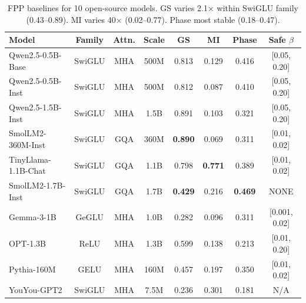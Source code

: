 
\begin{table}[t]
\centering
\caption{FPP baselines for 10 open-source models. GS varies 2.1$\times$ within SwiGLU family 
(0.43--0.89). MI varies 40$\times$ (0.02--0.77). Phase most stable (0.18--0.47).}
\label{tab:ten_models_full}
\begin{tabular}{lccccccc}
\toprule
Model & Family & Attn. & Scale & GS & MI & Phase & Safe $\beta$ \\
\midrule
Qwen2.5-0.5B-Base  & SwiGLU & MHA & 500M & 0.813 & 0.129 & 0.416 & [0.05, 0.20] \\
Qwen2.5-0.5B-Inst  & SwiGLU & MHA & 500M & 0.812 & 0.087 & 0.410 & [0.05, 0.20] \\
Qwen2.5-1.5B-Inst  & SwiGLU & MHA & 1.5B & 0.891 & 0.103 & 0.321 & [0.05, 0.20] \\
SmolLM2-360M-Inst  & SwiGLU & GQA & 360M & \textbf{0.890} & 0.069 & 0.311 & [0.01, 0.02] \\
TinyLlama-1.1B-Chat& SwiGLU & GQA & 1.1B & 0.798 & \textbf{0.771} & 0.389 & [0.01, 0.02] \\
SmolLM2-1.7B-Inst  & SwiGLU & GQA & 1.7B & \textbf{0.429} & 0.216 & \textbf{0.469} & NONE \\
Gemma-3-1B         & GeGLU  & MHA & 1.0B & 0.282 & 0.096 & 0.311 & [0.001, 0.02] \\
OPT-1.3B           & ReLU   & MHA & 1.3B & 0.599 & 0.138 & 0.213 & [0.01, 0.20] \\
Pythia-160M        & GELU   & MHA & 160M & 0.457 & 0.197 & 0.350 & [0.01, 0.02] \\
YouYou-GPT2        & SwiGLU & MHA & 7.5M & 0.236 & 0.301 & 0.181 & N/A \\
\bottomrule
\end{tabular}
\end{table}
